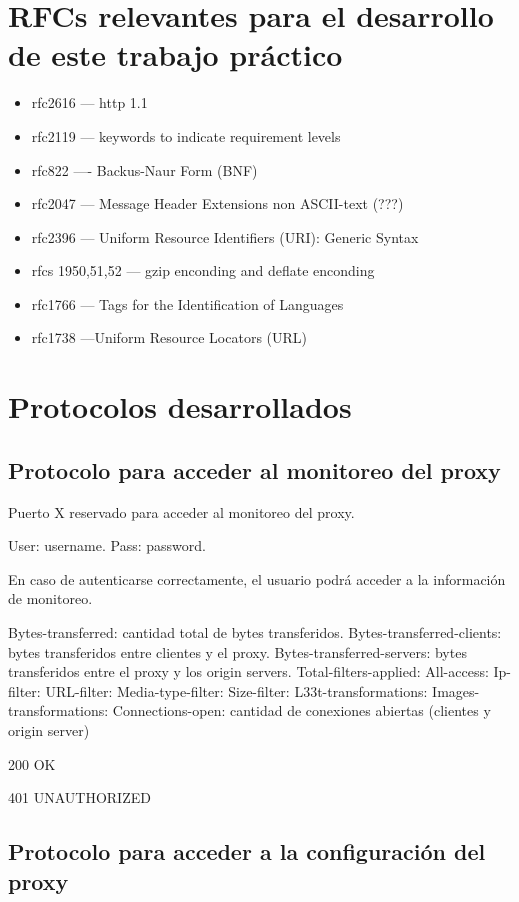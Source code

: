 \documentclass[a4paper,10pt]{article}
\begin{document}
\section{RFCs relevantes para el desarrollo de este trabajo pr\'actico}
\begin{itemize}
 \item rfc2616 --- http 1.1
 \item rfc2119 --- keywords to indicate requirement levels
 \item rfc822 ---- Backus-Naur Form (BNF)
 \item rfc2047 --- Message Header Extensions non ASCII-text (???)
 \item rfc2396 --- Uniform Resource Identifiers (URI): Generic Syntax

 \item rfcs 1950,51,52 --- gzip enconding and deflate enconding
 \item rfc1766 --- Tags for the Identification of Languages
 \item rfc1738 ---Uniform Resource Locators (URL)
\end{itemize}


\newpage
\section{Protocolos desarrollados}

\subsection{Protocolo para acceder al monitoreo del proxy}

Puerto X reservado para acceder al monitoreo del proxy.

User: username.
Pass: password.

En caso de autenticarse correctamente, el usuario podr\'a acceder a la información de monitoreo.

Bytes-transferred: cantidad total de bytes transferidos.
Bytes-transferred-clients: bytes transferidos entre clientes y el proxy.
Bytes-transferred-servers: bytes transferidos entre el proxy y los origin servers.
Total-filters-applied:
All-access:
Ip-filter:
URL-filter:
Media-type-filter:
Size-filter:
L33t-transformations:
Images-transformations:
Connections-open: cantidad de conexiones abiertas (clientes y origin server)


200 OK

401 UNAUTHORIZED

\newpage
\subsection{Protocolo para acceder a la configuración del proxy}
\end{document}
